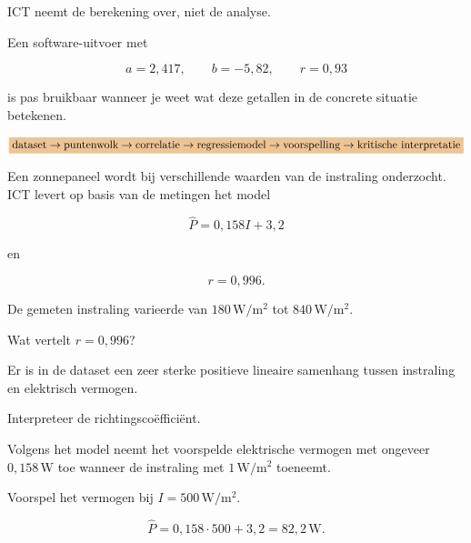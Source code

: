 \documentclass{ximera}
\begin{document}
\begin{opmerking}
ICT neemt de berekening over, niet de analyse.

Een software-uitvoer met

\[
a=2{,}417,\qquad b=-5{,}82,\qquad r=0{,}93
\]

is pas bruikbaar wanneer je weet wat deze getallen in de concrete
situatie betekenen.
\end{opmerking}



\[
\important{
\text{dataset}
\rightarrow
\text{puntenwolk}
\rightarrow
\text{correlatie}
\rightarrow
\text{regressiemodel}
\rightarrow
\text{voorspelling}
\rightarrow
\text{kritische interpretatie}
}
\]

\begin{oefening}{\oefU \ESS}

Een zonnepaneel wordt bij verschillende waarden van de instraling
onderzocht. ICT levert op basis van de metingen het model

\[
\hat P=0{,}158I+3{,}2
\]

en

\[
r=0{,}996.
\]

De gemeten instraling varieerde van
$180\,\mathrm{W/m^2}$ tot $840\,\mathrm{W/m^2}$.

\begin{question}
Wat vertelt $r=0{,}996$?

\begin{oplossing}
Er is in de dataset een zeer sterke positieve lineaire samenhang tussen
instraling en elektrisch vermogen.
\end{oplossing}
\end{question}

\begin{question}
Interpreteer de richtingscoëfficiënt.

\begin{oplossing}
Volgens het model neemt het voorspelde elektrische vermogen met
ongeveer $0{,}158\,\mathrm W$ toe wanneer de instraling met
$1\,\mathrm{W/m^2}$ toeneemt.
\end{oplossing}
\end{question}

\begin{question}
Voorspel het vermogen bij $I=500\,\mathrm{W/m^2}$.

\begin{oplossing}
\[
\hat P=0{,}158\cdot500+3{,}2=82{,}2\,\mathrm W.
\]
\end{oplossing}
\end{question}


\end{oefening}
\end{document}

